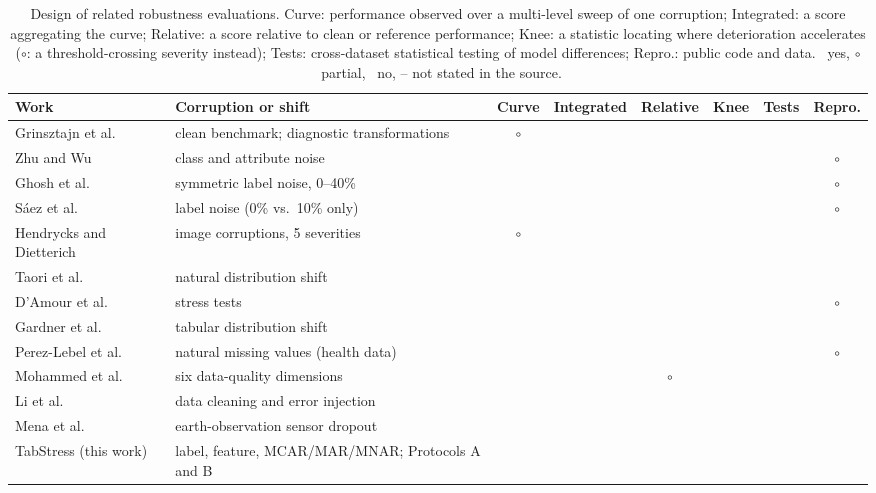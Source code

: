 \documentclass[pdflatex,sn-mathphys]{sn-jnl}
\newcommand{\cmark}{\ding{51}}
\newcommand{\xmark}{\ding{55}}
\newcommand{\pmark}{$\circ$}
\theoremstyle{thmstyleone}
\theoremstyle{thmstyletwo}
\theoremstyle{thmstylethree}
\begin{document}
\begin{table}[t]
\centering
\footnotesize
\caption{Design of related robustness evaluations. Curve: performance observed over a multi-level sweep of one corruption; Integrated: a score aggregating the curve; Relative: a score relative to clean or reference performance; Knee: a statistic locating where deterioration accelerates (\pmark: a threshold-crossing severity instead); Tests: cross-dataset statistical testing of model differences; Repro.: public code and data. \cmark\ yes, \pmark\ partial, \xmark\ no, -- not stated in the source.}
\label{tab:comparison}
\setlength{\tabcolsep}{2.5pt}
\begin{tabular}{@{}p{3.3cm}p{3.0cm}cccccc@{}}
\toprule
Work & Corruption or shift & Curve & Integrated & Relative & Knee & Tests & Repro. \\
\midrule
Grinsztajn et al.~\cite{grinsztajn2022tree} & clean benchmark; diagnostic transformations & \pmark & \xmark & \xmark & \xmark & \xmark & \cmark \\
Zhu and Wu~\cite{zhu2004class} & class and attribute noise & \cmark & \xmark & \xmark & \xmark & \xmark & \pmark \\
Ghosh et al.~\cite{ghosh2017robustness} & symmetric label noise, 0--40\% & \cmark & \xmark & \xmark & \xmark & \xmark & \pmark \\
S\'aez et al.~\cite{saez2015evaluating} & label noise (0\% vs.\ 10\% only) & \xmark & \xmark & \cmark & \xmark & \xmark & \pmark \\
Hendrycks and Dietterich~\cite{hendrycks2019benchmarking} & image corruptions, 5 severities & \pmark & \cmark & \cmark & \xmark & \xmark & \cmark \\
Taori et al.~\cite{taori2020measuring} & natural distribution shift & \xmark & \xmark & \cmark & \xmark & \xmark & \cmark \\
D'Amour et al.~\cite{damour2022underspecification} & stress tests & \xmark & \xmark & \xmark & \xmark & \xmark & \pmark \\
Gardner et al.~\cite{gardner2023tableshift} & tabular distribution shift & \xmark & \xmark & \cmark & \xmark & \xmark & \cmark \\
Perez-Lebel et al.~\cite{perezlebel2022benchmarking} & natural missing values (health data) & \xmark & \xmark & \xmark & \xmark & \cmark & \pmark \\
Mohammed et al.~\cite{mohammed2025effects} & six data-quality dimensions & \cmark & \xmark & \pmark & \xmark & \xmark & \cmark \\
Li et al.~\cite{li2021cleanml} & data cleaning and error injection & \cmark & \xmark & \cmark & \xmark & \xmark & \cmark \\
Mena et al.~\cite{mena2025multisensor} & earth-observation sensor dropout & \cmark & \xmark & \cmark & \xmark & \xmark & \cmark \\
TabStress (this work) & label, feature, MCAR/MAR/MNAR; Protocols A and B & \cmark & \cmark & \cmark & \cmark & \cmark & \cmark \\
\bottomrule
\end{tabular}
\end{table}
\end{document}
